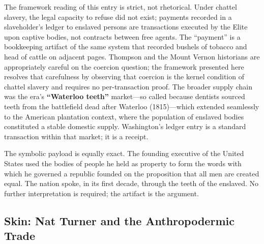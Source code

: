 The framework reading of this entry is strict, not rhetorical. Under chattel slavery, the legal capacity to refuse did not exist; payments recorded in a slaveholder's ledger to enslaved persons are transactions executed by the Elite upon captive bodies, not contracts between free agents. The ``payment'' is a bookkeeping artifact of the same system that recorded bushels of tobacco and head of cattle on adjacent pages. Thompson and the Mount Vernon historians are appropriately careful on the coercion question; the framework presented here resolves that carefulness by observing that coercion is the kernel condition of chattel slavery and requires no per-transaction proof. The broader supply chain was the era's \textbf{``Waterloo teeth''} market---so called because dentists sourced teeth from the battlefield dead after Waterloo (1815)---which extended seamlessly to the American plantation context, where the population of enslaved bodies constituted a stable domestic supply. Washington's ledger entry is a standard transaction within that market; it is a receipt.

The symbolic payload is equally exact. The founding executive of the United States used the bodies of people he held as property to form the words with which he governed a republic founded on the proposition that all men are created equal. The nation spoke, in its first decade, through the teeth of the enslaved. No further interpretation is required; the artifact is the argument.

\subsection{Skin: Nat Turner and the Anthropodermic Trade}
\label{subsec:skin}


